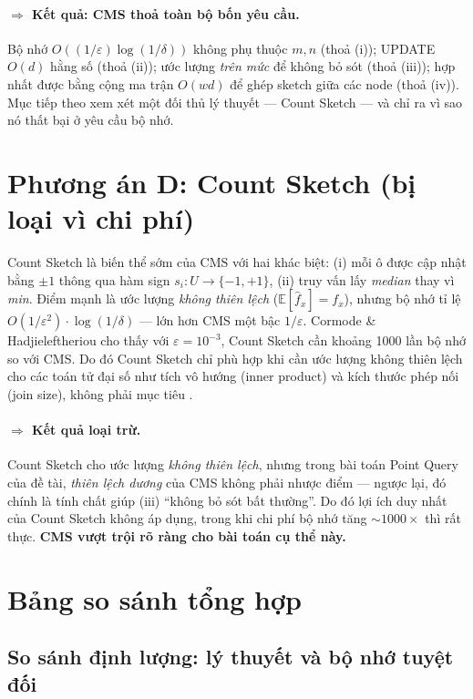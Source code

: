 \paragraph{$\Rightarrow$ Kết quả: CMS thoả toàn bộ bốn yêu cầu.}
Bộ nhớ $O((1/\varepsilon)\log(1/\delta))$ không phụ thuộc $m,n$ (thoả (i)); UPDATE $O(d)$ hằng số (thoả (ii)); ước lượng \textit{trên mức} để không bỏ sót (thoả (iii)); hợp nhất được bằng cộng ma trận $O(wd)$ để ghép sketch giữa các node (thoả (iv)). Mục tiếp theo xem xét một đối thủ lý thuyết --- Count Sketch --- và chỉ ra vì sao nó thất bại ở yêu cầu bộ nhớ.

\section{Phương án D: Count Sketch (bị loại vì chi phí)}
\label{sec:countsketch}

Count Sketch \cite{charikar2004count} là biến thể sớm của CMS với hai khác biệt: (i) mỗi ô được cập nhật bằng $\pm 1$ thông qua hàm sign $s_i: U \to \{-1, +1\}$, (ii) truy vấn lấy \textit{median} thay vì \textit{min}. Điểm mạnh là ước lượng \textit{không thiên lệch} ($\mathbb{E}[\hat{f}_x] = f_x$), nhưng bộ nhớ tỉ lệ $O(1/\varepsilon^2)\cdot \log(1/\delta)$ --- lớn hơn CMS một bậc $1/\varepsilon$. Cormode \& Hadjieleftheriou \cite{cormode2008finding} cho thấy với $\varepsilon = 10^{-3}$, Count Sketch cần khoảng 1000 lần bộ nhớ so với CMS. Do đó Count Sketch chỉ phù hợp khi cần ước lượng không thiên lệch cho các toán tử đại số như tích vô hướng (inner product) và kích thước phép nối (join size), không phải mục tiêu .

\paragraph{$\Rightarrow$ Kết quả loại trừ.}
Count Sketch cho ước lượng \textit{không thiên lệch}, nhưng trong bài toán Point Query của đề tài, \textit{thiên lệch dương} của CMS không phải nhược điểm --- ngược lại, đó chính là tính chất giúp (iii) ``không bỏ sót bất thường''. Do đó lợi ích duy nhất của Count Sketch không áp dụng, trong khi chi phí bộ nhớ tăng $\sim 1000\times$ thì rất thực. \textbf{CMS vượt trội rõ ràng cho bài toán cụ thể này.}

\section{Bảng so sánh tổng hợp}

\subsection{So sánh định lượng: lý thuyết và bộ nhớ tuyệt đối}

